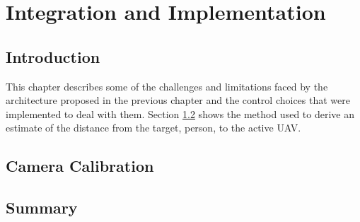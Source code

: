 \chapter{Integration and Implementation}

\section{Introduction}

This chapter describes some of the challenges and limitations faced by the architecture proposed in the previous chapter and the control choices that were implemented to deal with them.
Section \ref{ch:calibration} shows the method used to derive an  estimate of the distance from the target, person, to the active \ac{UAV}. 


\section{Camera Calibration}\label{ch:calibration} 



\section{Summary}   

